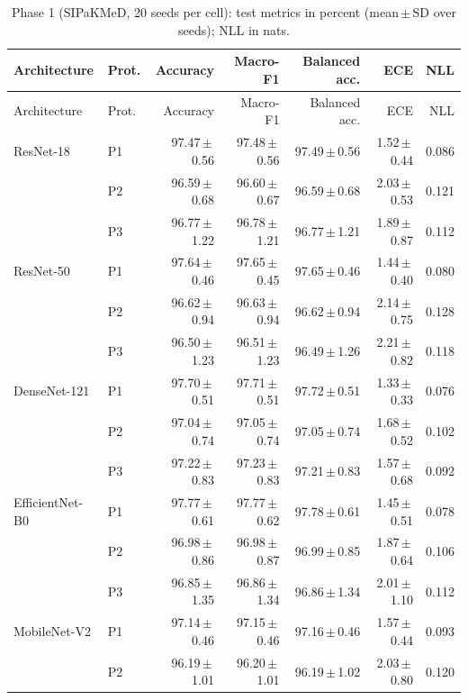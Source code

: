 {\footnotesize
\setlength{\tabcolsep}{3.5pt}
\begin{longtable}{llrrrrr}
\caption{Phase 1 (SIPaKMeD, 20 seeds per cell): test metrics in percent (mean\,$\pm$\,SD over seeds); NLL in nats.}\label{r:tab:phase1}\\
\toprule
Architecture & Prot. & Accuracy & Macro-F1 & Balanced acc. & ECE & NLL \\
\midrule
\endfirsthead
\toprule
Architecture & Prot. & Accuracy & Macro-F1 & Balanced acc. & ECE & NLL \\
\midrule
\endhead
\bottomrule
\endfoot
ResNet-18 & P1 & 97.47\,$\pm$\,0.56 & 97.48\,$\pm$\,0.56 & 97.49\,$\pm$\,0.56 & 1.52\,$\pm$\,0.44 & 0.086 \\
 & P2 & 96.59\,$\pm$\,0.68 & 96.60\,$\pm$\,0.67 & 96.59\,$\pm$\,0.68 & 2.03\,$\pm$\,0.53 & 0.121 \\
 & P3 & 96.77\,$\pm$\,1.22 & 96.78\,$\pm$\,1.21 & 96.77\,$\pm$\,1.21 & 1.89\,$\pm$\,0.87 & 0.112 \\
ResNet-50 & P1 & 97.64\,$\pm$\,0.46 & 97.65\,$\pm$\,0.45 & 97.65\,$\pm$\,0.46 & 1.44\,$\pm$\,0.40 & 0.080 \\
 & P2 & 96.62\,$\pm$\,0.94 & 96.63\,$\pm$\,0.94 & 96.62\,$\pm$\,0.94 & 2.14\,$\pm$\,0.75 & 0.128 \\
 & P3 & 96.50\,$\pm$\,1.23 & 96.51\,$\pm$\,1.23 & 96.49\,$\pm$\,1.26 & 2.21\,$\pm$\,0.82 & 0.118 \\
DenseNet-121 & P1 & 97.70\,$\pm$\,0.51 & 97.71\,$\pm$\,0.51 & 97.72\,$\pm$\,0.51 & 1.33\,$\pm$\,0.33 & 0.076 \\
 & P2 & 97.04\,$\pm$\,0.74 & 97.05\,$\pm$\,0.74 & 97.05\,$\pm$\,0.74 & 1.68\,$\pm$\,0.52 & 0.102 \\
 & P3 & 97.22\,$\pm$\,0.83 & 97.23\,$\pm$\,0.83 & 97.21\,$\pm$\,0.83 & 1.57\,$\pm$\,0.68 & 0.092 \\
EfficientNet-B0 & P1 & 97.77\,$\pm$\,0.61 & 97.77\,$\pm$\,0.62 & 97.78\,$\pm$\,0.61 & 1.45\,$\pm$\,0.51 & 0.078 \\
 & P2 & 96.98\,$\pm$\,0.86 & 96.98\,$\pm$\,0.87 & 96.99\,$\pm$\,0.85 & 1.87\,$\pm$\,0.64 & 0.106 \\
 & P3 & 96.85\,$\pm$\,1.35 & 96.86\,$\pm$\,1.34 & 96.86\,$\pm$\,1.34 & 2.01\,$\pm$\,1.10 & 0.112 \\
MobileNet-V2 & P1 & 97.14\,$\pm$\,0.46 & 97.15\,$\pm$\,0.46 & 97.16\,$\pm$\,0.46 & 1.57\,$\pm$\,0.44 & 0.093 \\
 & P2 & 96.19\,$\pm$\,1.01 & 96.20\,$\pm$\,1.01 & 96.19\,$\pm$\,1.02 & 2.03\,$\pm$\,0.80 & 0.120 \\

\end{longtable}}
